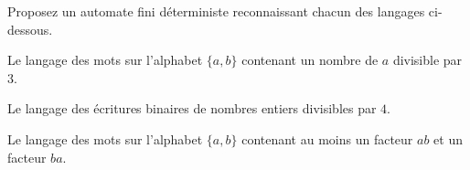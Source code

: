 
\begingroup

\begin{exercice}\label{exo:lexing/automata/write_automata}

  Proposez un automate fini déterministe reconnaissant chacun des langages ci-dessous.
  \begin{questions}
  \item Le langage des mots sur l'alphabet $\{a,b\}$ contenant un nombre de $a$ divisible par $3$. 
  \item Le langage des écritures binaires de nombres entiers divisibles par $4$. 
  \item Le langage des mots sur l'alphabet $\{a,b\}$ contenant au moins un facteur $ab$ et un facteur $ba$. 
  \end{questions}

\end{exercice}

